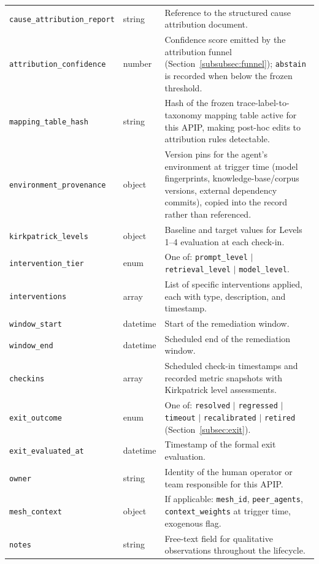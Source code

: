 \begin{table}[t]
\begin{tabular}{@{}L{4.2cm}L{1.8cm}L{10.4cm}@{}}
    \texttt{cause\_attribution\_report} & string &
      Reference to the structured cause attribution document. \\
    \texttt{attribution\_confidence} & number &
      Confidence score emitted by the attribution funnel
      (Section~\ref{subsubsec:funnel}); \texttt{abstain} is recorded when
      below the frozen threshold. \\
    \texttt{mapping\_table\_hash} & string &
      Hash of the frozen trace-label-to-taxonomy mapping table active for
      this APIP, making post-hoc edits to attribution rules detectable. \\
    \texttt{environment\_provenance} & object &
      Version pins for the agent's environment at trigger time (model
      fingerprints, knowledge-base/corpus versions, external dependency
      commits), copied into the record rather than referenced. \\
    \texttt{kirkpatrick\_levels} & object &
      Baseline and target values for Levels 1--4 evaluation at each
      check-in. \\
    \texttt{intervention\_tier} & enum &
      One of: \texttt{prompt\_level} $|$ \texttt{retrieval\_level} $|$
      \texttt{model\_level}. \\
    \texttt{interventions} & array &
      List of specific interventions applied, each with type, description,
      and timestamp. \\
    \texttt{window\_start} & datetime &
      Start of the remediation window. \\
    \texttt{window\_end} & datetime &
      Scheduled end of the remediation window. \\
    \texttt{checkins} & array &
      Scheduled check-in timestamps and recorded metric snapshots with
      Kirkpatrick level assessments. \\
    \texttt{exit\_outcome} & enum &
      One of: \texttt{resolved} $|$ \texttt{regressed} $|$ \texttt{timeout}
      $|$ \texttt{recalibrated} $|$ \texttt{retired}
      (Section~\ref{subsec:exit}). \\
    \texttt{exit\_evaluated\_at} & datetime &
      Timestamp of the formal exit evaluation. \\
    \texttt{owner} & string &
      Identity of the human operator or team responsible for this APIP. \\
    \texttt{mesh\_context} & object &
      If applicable: \texttt{mesh\_id}, \texttt{peer\_agents},
      \texttt{context\_weights} at trigger time, exogenous flag. \\
    \texttt{notes} & string &
      Free-text field for qualitative observations throughout the
      lifecycle. \\
    \bottomrule
  \end{tabular}
\end{table}


